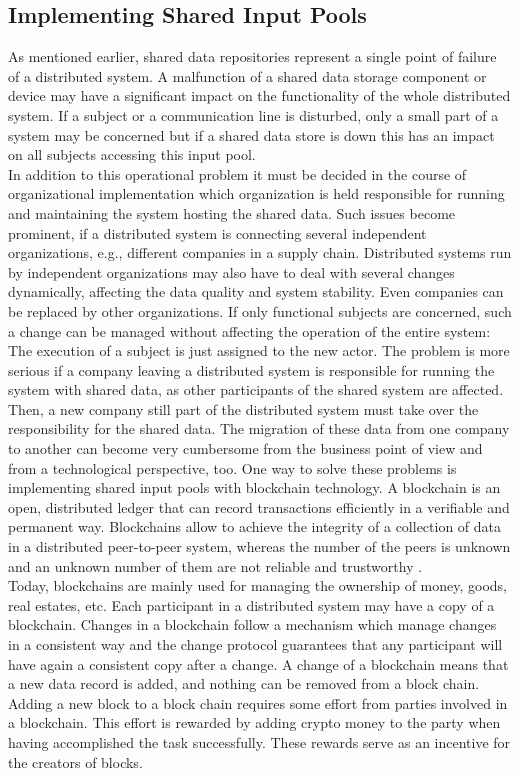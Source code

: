 \subsection{Implementing Shared Input Pools}
As mentioned earlier, shared data repositories represent a single point of failure of a distributed system. A malfunction of a shared data storage component or device may have a significant impact on the functionality of the whole distributed system. If a subject or a communication line is disturbed, only a small part of a system may be concerned but if a shared data store is down this has an impact on all subjects accessing this input pool.
\\
In addition to this operational problem it must be decided in the course of organizational implementation which organization is held responsible for running and maintaining the system hosting the shared data. Such issues become prominent, if a distributed system is connecting several independent organizations, e.g., different companies in a supply chain. Distributed systems run by independent organizations may also have to deal with several changes dynamically, affecting the data quality and system stability. Even companies can be replaced by other organizations. If only functional subjects are concerned, such a change can be managed without affecting the operation of the entire system: The execution of a subject is just assigned to the new actor. The problem is more serious if a company leaving a distributed system is responsible for running the system with shared data, as other participants of the shared system are affected. Then, a new company still part of the distributed system must take over the responsibility for the shared data. The migration of these data from one company to another can become very cumbersome from the business point of view and from a technological perspective, too.
One way to solve these problems is implementing shared input pools with blockchain technology. A blockchain is an open, distributed ledger that can record transactions efficiently in a verifiable and permanent way. Blockchains allow to achieve the integrity of a collection of data in a distributed peer-to-peer system, whereas the number of the peers is unknown and an unknown number of them are not reliable and trustworthy \cite{book:Blockchainbasics}.
\\
Today, blockchains are mainly used for managing the ownership of money, goods, real estates, etc. Each participant in a distributed system may have a copy of a blockchain. Changes in a blockchain follow a mechanism which manage changes in a consistent way and the change protocol guarantees that any participant will have again a consistent copy after a change. A change of a blockchain means that a new data record is added, and nothing can be removed from a block chain. Adding a new block to a block chain requires some effort from parties involved in a blockchain. This effort is rewarded by adding crypto money to the party when having accomplished the task successfully. These rewards serve as an incentive for the creators of blocks.
